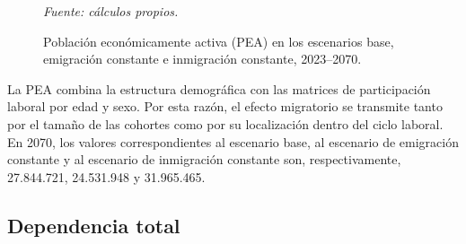 \documentclass[12pt,a4paper]{article}
\begin{document}
\begin{figure}[htbp]
\caption{Población económicamente activa (PEA) en los escenarios base, emigración constante e inmigración constante, 2023--2070.}
\label{fig:res_pea}
\vspace{0.2cm}
\par\footnotesize{\textit{Fuente: cálculos propios.}}
\end{figure}

La PEA combina la estructura demográfica con las matrices de participación laboral por edad y sexo. Por esta razón, el efecto migratorio se transmite tanto por el tamaño de las cohortes como por su localización dentro del ciclo laboral. En 2070, los valores correspondientes al escenario base, al escenario de emigración constante y al escenario de inmigración constante son, respectivamente, 27.844.721, 24.531.948 y 31.965.465.

\subsection{Dependencia total}
\end{document}
